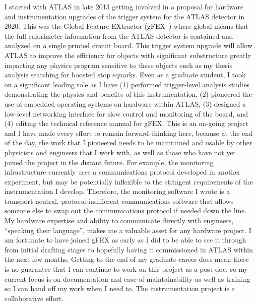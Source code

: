 \documentclass[letterpaper, 10pt]{article}
\begin{document}
I started with ATLAS in late 2013 getting involved in a proposal for hardware and instrumentation upgrades of the trigger system for the ATLAS detector in 2020. This was the Global Feature EXtractor (gFEX~) where global means that the full calorimeter information from the ATLAS detector is contained and analyzed on a single printed circuit board. This trigger system upgrade will allow ATLAS to improve the efficiency for objects with significant substructure greatly impacting any physics program sensitive to these objects such as my thesis analysis searching for boosted stop squarks. Even as a graduate student, I took on a significant leading role as I have (1) performed trigger-level analysis studies demonstrating the physics and benefits of this instrumentation, (2) pioneered the use of embedded operating systems on hardware within ATLAS, (3) designed a low-level networking interface for slow control and monitoring of the board, and (4) editing the technical reference manual for gFEX. This is an on-going project and I have made every effort to remain forward-thinking here, because at the end of the day, the work that I pioneered needs to be maintained and usable by other physicists and engineers that I work with, as well as those who have not yet joined the project in the distant future. For example, the monitoring infrastructure currently uses a communications protocol developed in another experiment, but may be potentially inflexible to the stringent requirements of the instrumentation I develop. Therefore, the monitoring software I wrote is a transport-neutral, protocol-indifferent communications software that allows someone else to swap out the communications protocol if needed down the line. My hardware expertise and ability to communicate directly with engineers, ``speaking their language'', makes me a valuable asset for any hardware project. I am fortunate to have joined gFEX as early as I did to be able to see it through from initial drafting stages to hopefully having it commissioned in ATLAS within the next few months. Getting to the end of my graduate career does mean there is no guarantee that I can continue to work on this project as a post-doc, so my current focus is on documentation and ease-of-maintainability as well as training so I can hand off my work when I need to. The instrumentation project is a collaborative effort.
\end{document}
